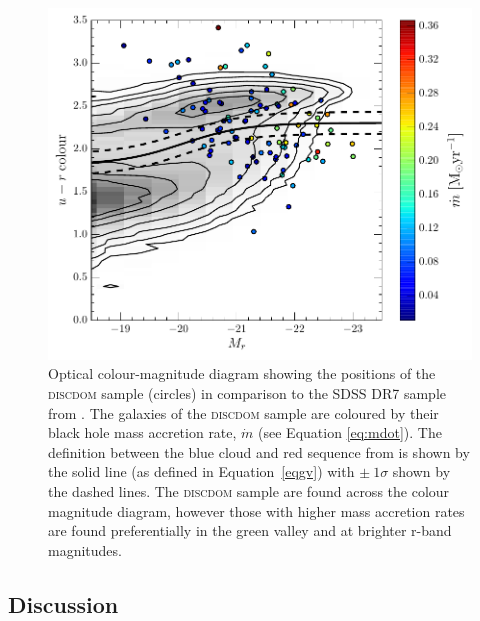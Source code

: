 {\begin{figure}
\centering
\includegraphics[width=\textwidth]{agn/CMD_DISCDOM_coloured_accretion_rate.pdf}
\caption[Colour-magnitude diagram for the DISCDOM sample, coloured by black hole mass accretion rate]{Optical colour-magnitude diagram showing the positions of the \textsc{discdom} sample (circles) in comparison to the SDSS DR7 sample from \citet{Baldry04}. The galaxies of the \textsc{discdom} sample are coloured by their black hole mass accretion rate, $\dot{m}$ (see Equation \ref{eq:mdot}). The definition between the blue cloud and red sequence  from \citet{Baldry04} is shown by the solid line (as defined in Equation~\ref{eqgv}) with $\pm~1\sigma$ shown by the dashed lines. The \textsc{discdom} sample are found across the colour magnitude diagram, however those with higher mass accretion rates are found preferentially in the green valley and at brighter r-band magnitudes.}
\label{fig:cmdmdot}
\end{figure}


%
%  
\subsection{Discussion}\label{sec:intdiscussion}
%
%


}
